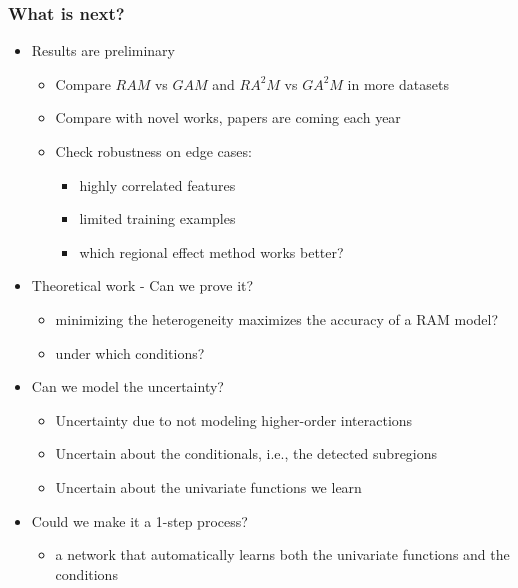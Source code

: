 \documentclass{beamer}
\begin{document}
\begin{frame}
  \frametitle{What is next?}
  \begin{itemize}
  \item Results are preliminary
    \begin{itemize}
    \item Compare $RAM$ vs $GAM$ and $RA^2M$ vs $GA^2M$ in more datasets
      \item Compare with novel works, papers are coming each year
      \item Check robustness on edge cases:
        \begin{itemize}
        \item highly correlated features
        \item limited training examples
        \item which regional effect method works better?
        \end{itemize}
      \end{itemize}

    \item Theoretical work - Can we prove it?
      \begin{itemize}
      \item minimizing the heterogeneity maximizes the accuracy of a RAM model?
      \item under which conditions?
      \end{itemize}

    \item Can we model the uncertainty?
      \begin{itemize}
      \item Uncertainty due to not modeling higher-order interactions
      \item Uncertain about the conditionals, i.e., the detected subregions
      \item Uncertain about the univariate functions we learn
      \end{itemize}

    \item Could we make it a 1-step process?
      \begin{itemize}
        \item a network that automatically learns both the univariate functions and the conditions
      \end{itemize}
  \end{itemize}

\end{frame}
\end{document}
